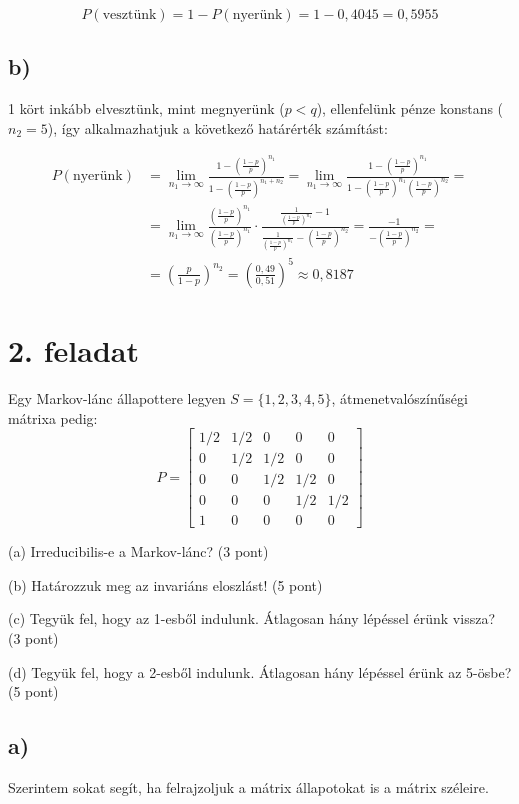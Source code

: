 \documentclass[a4paper,12pt]{article}
\begin{document}
\[P(\text{vesztünk}) = 1 - P(\text{nyerünk}) = 1 - 0,4045 = 0,5955\]

\subsection*{b)}
1 kört inkább elvesztünk, mint megnyerünk ($p<q$), ellenfelünk pénze konstans
($n_2 = 5$), így alkalmazhatjuk a következő határérték számítást:

\[
\begin{split}
P(\text{nyerünk}) &= 
\lim_{n_1 \to \infty} \frac{1-\left(\frac{1-p}{p}\right)^{n_1}}
{1-\left(\frac{1-p}{p}\right)^{n_1+n_2}} =
\lim_{n_1 \to \infty} \frac{1-\left(\frac{1-p}{p}\right)^{n_1}}
{1-\left(\frac{1-p}{p}\right)^{n_1}\left(\frac{1-p}{p}\right)^{n_2}} =\\
&= \lim_{n_1 \to \infty} \frac{\left(\frac{1-p}{p}\right)^{n_1}}
{\left(\frac{1-p}{p}\right)^{n_1}} \cdot 
\frac{\frac{1}{\left(\frac{1-p}{p}\right)^{n_1}}-1}
{\frac{1}{\left(\frac{1-p}{p}\right)^{n_1}} -
\left(\frac{1-p}{p}\right)^{n_2}} 
= \frac{-1}{-\left(\frac{1-p}{p}\right)^{n_2}} =\\
&= \left(\frac{p}{1-p}\right)^{n_2} = 
\left(\frac{0,49}{0,51}\right)^{5} \approx 0,8187
\end{split}
\]

\pagebreak
\section*{2. feladat}
Egy Markov-lánc állapottere legyen $S=\{1,2,3,4,5\}$, átmenetvalószínűségi
mátrixa pedig:
\[
P = 
\begin{bmatrix}
1/2	&	1/2	&	0	&	0	&	0	\\
0	&	1/2	&	1/2	&	0	&	0	\\
0	&	0	&	1/2	&	1/2	&	0	\\
0	&	0	&	0	&	1/2	&	1/2	\\
1	&	0	&	0	&	0	&	0
\end{bmatrix}
\]

(a) Irreducibilis-e a Markov-lánc? (3 pont)

(b) Határozzuk meg az invariáns eloszlást! (5 pont)

(c) Tegyük fel, hogy az 1-esből indulunk. Átlagosan hány lépéssel érünk
vissza? (3 pont)

(d) Tegyük fel, hogy a 2-esből indulunk. Átlagosan hány lépéssel érünk
az 5-ösbe? (5 pont)

\subsection*{a)}
Szerintem sokat segít, ha felrajzoljuk a mátrix állapotokat is a mátrix
széleire.
\end{document}
